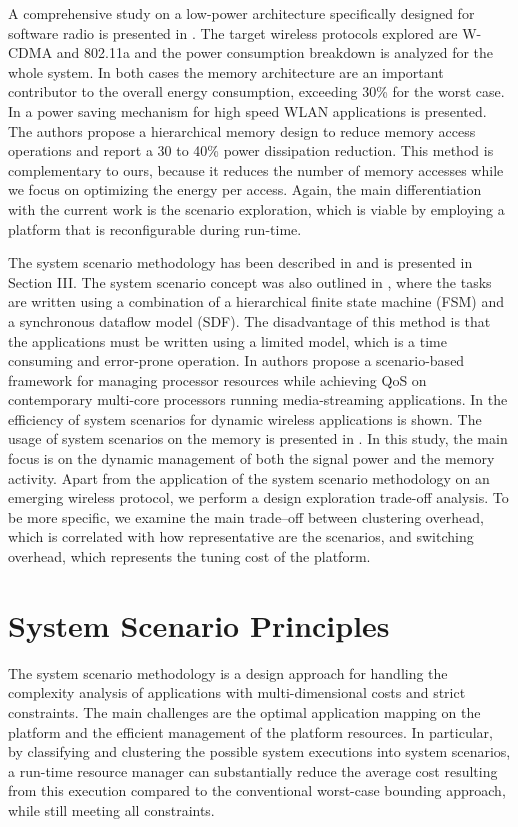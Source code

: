A comprehensive study on a low-power architecture specifically designed for software radio is presented in \cite{22}. The target wireless protocols explored are W-CDMA and 802.11a and the power consumption breakdown is analyzed for the whole system. In both cases the memory architecture are an important contributor to the overall energy consumption, exceeding 30\% for the worst case. In \cite{23} a power saving mechanism for high speed WLAN applications is presented. The authors propose a hierarchical memory design to reduce memory access operations and report a 30 to 40\% power dissipation reduction. This method is complementary to ours, because it reduces the number of memory accesses while we focus on optimizing the energy per access. Again, the main differentiation with the current work is the scenario exploration, which is viable by employing a platform that is reconfigurable during run-time.

The system scenario methodology has been described in \cite{13} and is presented in Section III. The system scenario concept was also outlined in \cite{15}, where the tasks are written using a combination of a hierarchical finite state machine (FSM) and a synchronous dataflow model (SDF). The disadvantage of this method is that the applications must be written using a limited model, which is a time consuming and error-prone operation. In \cite{16} authors propose a scenario-based framework for managing processor resources while achieving QoS on contemporary multi-core processors running media-streaming applications. In \cite{21} the efficiency of system scenarios for dynamic wireless applications is shown. The usage of system scenarios on the memory is presented in \cite{20}. In this study, the main focus is on the dynamic management of both the signal power and the memory activity. Apart from the application of the system scenario methodology on an emerging wireless protocol, we perform a design exploration trade-off analysis. To be more specific, we examine the main trade–off between clustering overhead, which is correlated with how representative are the scenarios, and switching overhead, which represents the tuning cost of the platform.

\section{System Scenario Principles}

The system scenario methodology is a design approach for handling the complexity analysis of applications with multi-dimensional costs and strict constraints. The main challenges are the optimal application mapping on the platform and the efficient management of the platform resources. In particular, by classifying and clustering the possible system executions into system scenarios, a run-time resource manager can substantially reduce the average cost resulting from this execution compared to the conventional worst-case bounding approach, while still meeting all constraints.

